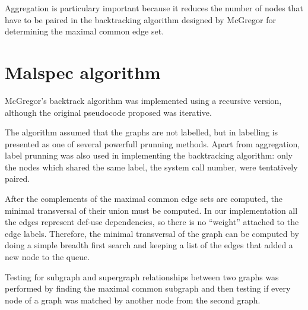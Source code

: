 Aggregation is particulary important because it reduces the number of nodes that have to be paired in the backtracking algorithm designed by McGregor for determining the maximal common edge set.

\section{Malspec algorithm}
\label{fourth:malspec-alg}

McGregor's backtrack algorithm was implemented using a recursive version, although the original pseudocode proposed was iterative.

The algorithm assumed that the graphs are not labelled, but in \cite{minimal-contrast-subgraph} labelling is presented as one of several powerfull prunning methods. Apart from aggregation, label prunning was also used in implementing the backtracking algorithm: only the nodes which shared the same label, the system call number, were tentatively paired.

After the complements of the maximal common edge sets are computed, the minimal transversal of their union must be computed. In our implementation all the edges represent def-use dependencies, so there is no ``weight'' attached to the edge labels. Therefore, the minimal transversal of the graph can be computed by doing a simple breadth first search and keeping a list of the edges that added a new node to the queue.

Testing for subgraph and supergraph relationships between two graphs was performed by finding the maximal common subgraph and then testing if every node of a graph was matched by another node from the second graph.
